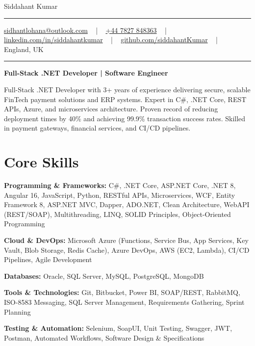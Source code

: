 \documentclass[letterpaper,10pt]{article}
\newcommand{\documentTitle}[2]{
  \begin{center}
    \vspace*{-0.3in}
    {\Huge\color{accentTitle} #1}
    \vspace{8pt}
    {\color{accentLine} \hrule}
    \vspace{2pt}
    \footnotesize{#2}
    \vspace{2pt}
    {\color{accentLine} \hrule}
  \end{center}
}
\newenvironment{resume_list}{
  \vspace{-7pt}
  \begin{itemize}[itemsep=-2px, parsep=1pt, leftmargin=30pt]
}{
  \end{itemize}
}
\begin{document}
\documentTitle{Siddahant Kumar}{
\vspace{0.1cm}
\href{mailto:sidhantlohana@outlook.com}{sidhantlohana@outlook.com} ~ | ~
\href{tel:+447827848363}{+44 7827 848363} ~ | ~
\href{https://www.linkedin.com/in/siddahantkumar/}{linkedin.com/in/siddahantkumar} ~ | ~
\href{https://github.com/siddahantKumar}{github.com/siddahantKumar} ~ | ~
England, UK
}

\begin{center}
\textbf{Full-Stack .NET Developer | Software Engineer}
\end{center}

Full-Stack .NET Developer with 3+ years of experience delivering secure, scalable FinTech payment solutions and ERP systems. Expert in C\#, .NET Core, REST APIs, Azure, and microservices architecture. Proven record of reducing deployment times by 40\% and achieving 99.9\% transaction success rates. Skilled in payment gateways, financial services, and CI/CD pipelines.


\section{Core Skills}

\begin{resume_list}
    \item \textbf{Programming \& Frameworks:} C\#, .NET Core, ASP.NET Core, .NET 8, Angular 16, JavaScript, Python, RESTful APIs, Microservices, WCF, Entity Framework 8, ASP.NET MVC, Dapper, ADO.NET, Clean Architecture, WebAPI (REST/SOAP), Multithreading, LINQ, SOLID Principles, Object-Oriented Programming
    \item \textbf{Cloud \& DevOps:} Microsoft Azure (Functions, Service Bus, App Services, Key Vault, Blob Storage, Redis Cache), Azure DevOps, AWS (EC2, Lambda), CI/CD Pipelines, Agile Development
    \item \textbf{Databases:} Oracle, SQL Server, MySQL, PostgreSQL, MongoDB
    \item \textbf{Tools \& Technologies:} Git, Bitbucket, Power BI, SOAP/REST, RabbitMQ, ISO-8583 Messaging, SQL Server Management, Requirements Gathering, Sprint Planning
    \item \textbf{Testing \& Automation:} Selenium, SoapUI, Unit Testing, Swagger, JWT, Postman, Automated Workflows, Software Design & Specifications
\end{resume_list}
\end{document}
